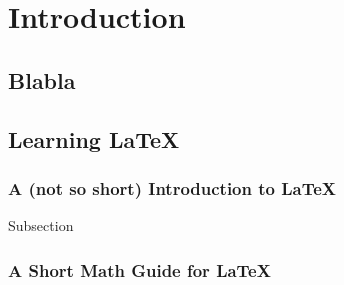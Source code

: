
\chapter{Introduction} %

\label{Chapter1} %



\section{Blabla}


\section{Learning \LaTeX{}}



\subsection{A (not so short) Introduction to \LaTeX{}}

Subsection

\subsection{A Short Math Guide for \LaTeX{}}

